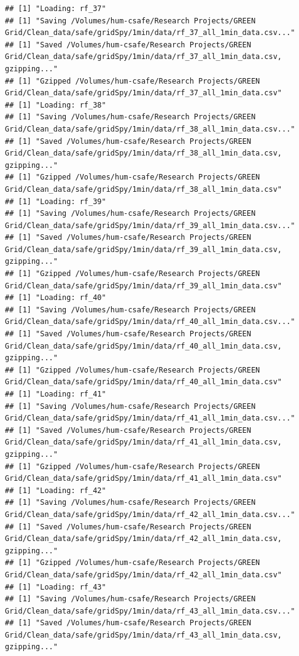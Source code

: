 \documentclass[]{article}
\begin{document}
\begin{verbatim}
## [1] "Loading: rf_37"
## [1] "Saving /Volumes/hum-csafe/Research Projects/GREEN Grid/Clean_data/safe/gridSpy/1min/data/rf_37_all_1min_data.csv..."
## [1] "Saved /Volumes/hum-csafe/Research Projects/GREEN Grid/Clean_data/safe/gridSpy/1min/data/rf_37_all_1min_data.csv, gzipping..."
## [1] "Gzipped /Volumes/hum-csafe/Research Projects/GREEN Grid/Clean_data/safe/gridSpy/1min/data/rf_37_all_1min_data.csv"
## [1] "Loading: rf_38"
## [1] "Saving /Volumes/hum-csafe/Research Projects/GREEN Grid/Clean_data/safe/gridSpy/1min/data/rf_38_all_1min_data.csv..."
## [1] "Saved /Volumes/hum-csafe/Research Projects/GREEN Grid/Clean_data/safe/gridSpy/1min/data/rf_38_all_1min_data.csv, gzipping..."
## [1] "Gzipped /Volumes/hum-csafe/Research Projects/GREEN Grid/Clean_data/safe/gridSpy/1min/data/rf_38_all_1min_data.csv"
## [1] "Loading: rf_39"
## [1] "Saving /Volumes/hum-csafe/Research Projects/GREEN Grid/Clean_data/safe/gridSpy/1min/data/rf_39_all_1min_data.csv..."
## [1] "Saved /Volumes/hum-csafe/Research Projects/GREEN Grid/Clean_data/safe/gridSpy/1min/data/rf_39_all_1min_data.csv, gzipping..."
## [1] "Gzipped /Volumes/hum-csafe/Research Projects/GREEN Grid/Clean_data/safe/gridSpy/1min/data/rf_39_all_1min_data.csv"
## [1] "Loading: rf_40"
## [1] "Saving /Volumes/hum-csafe/Research Projects/GREEN Grid/Clean_data/safe/gridSpy/1min/data/rf_40_all_1min_data.csv..."
## [1] "Saved /Volumes/hum-csafe/Research Projects/GREEN Grid/Clean_data/safe/gridSpy/1min/data/rf_40_all_1min_data.csv, gzipping..."
## [1] "Gzipped /Volumes/hum-csafe/Research Projects/GREEN Grid/Clean_data/safe/gridSpy/1min/data/rf_40_all_1min_data.csv"
## [1] "Loading: rf_41"
## [1] "Saving /Volumes/hum-csafe/Research Projects/GREEN Grid/Clean_data/safe/gridSpy/1min/data/rf_41_all_1min_data.csv..."
## [1] "Saved /Volumes/hum-csafe/Research Projects/GREEN Grid/Clean_data/safe/gridSpy/1min/data/rf_41_all_1min_data.csv, gzipping..."
## [1] "Gzipped /Volumes/hum-csafe/Research Projects/GREEN Grid/Clean_data/safe/gridSpy/1min/data/rf_41_all_1min_data.csv"
## [1] "Loading: rf_42"
## [1] "Saving /Volumes/hum-csafe/Research Projects/GREEN Grid/Clean_data/safe/gridSpy/1min/data/rf_42_all_1min_data.csv..."
## [1] "Saved /Volumes/hum-csafe/Research Projects/GREEN Grid/Clean_data/safe/gridSpy/1min/data/rf_42_all_1min_data.csv, gzipping..."
## [1] "Gzipped /Volumes/hum-csafe/Research Projects/GREEN Grid/Clean_data/safe/gridSpy/1min/data/rf_42_all_1min_data.csv"
## [1] "Loading: rf_43"
## [1] "Saving /Volumes/hum-csafe/Research Projects/GREEN Grid/Clean_data/safe/gridSpy/1min/data/rf_43_all_1min_data.csv..."
## [1] "Saved /Volumes/hum-csafe/Research Projects/GREEN Grid/Clean_data/safe/gridSpy/1min/data/rf_43_all_1min_data.csv, gzipping..."

\end{verbatim}
\end{document}
